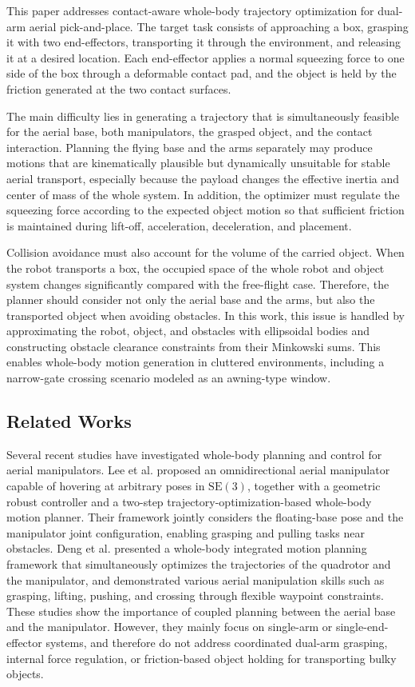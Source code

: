 \documentclass[letterpaper, 10 pt, conference]{ieeeconf}  %
\begin{document}
This paper addresses contact-aware whole-body trajectory optimization for dual-arm aerial pick-and-place. The target task consists of approaching a box, grasping it with two end-effectors, transporting it through the environment, and releasing it at a desired location. Each end-effector applies a normal squeezing force to one side of the box through a deformable contact pad, and the object is held by the friction generated at the two contact surfaces.

The main difficulty lies in generating a trajectory that is simultaneously feasible for the aerial base, both manipulators, the grasped object, and the contact interaction. Planning the flying base and the arms separately may produce motions that are kinematically plausible but dynamically unsuitable for stable aerial transport, especially because the payload changes the effective inertia and center of mass of the whole system. In addition, the optimizer must regulate the squeezing force according to the expected object motion so that sufficient friction is maintained during lift-off, acceleration, deceleration, and placement.

Collision avoidance must also account for the volume of the carried object. When the robot transports a box, the occupied space of the whole robot and object system changes significantly compared with the free-flight case. Therefore, the planner should consider not only the aerial base and the arms, but also the transported object when avoiding obstacles. In this work, this issue is handled by approximating the robot, object, and obstacles with ellipsoidal bodies and constructing obstacle clearance constraints from their Minkowski sums. This enables whole-body motion generation in cluttered environments, including a narrow-gate crossing scenario modeled as an awning-type window.

\subsection{Related Works}

Several recent studies have investigated whole-body planning and control for aerial manipulators. Lee et al. \cite{lee2025autonomous} proposed an omnidirectional aerial manipulator capable of hovering at arbitrary poses in $\mathrm{SE}(3)$, together with a geometric robust controller and a two-step trajectory-optimization-based whole-body motion planner. Their framework jointly considers the floating-base pose and the manipulator joint configuration, enabling grasping and pulling tasks near obstacles. Deng et al. \cite{deng2025whole} presented a whole-body integrated motion planning framework that simultaneously optimizes the trajectories of the quadrotor and the manipulator, and demonstrated various aerial manipulation skills such as grasping, lifting, pushing, and crossing through flexible waypoint constraints. These studies show the importance of coupled planning between the aerial base and the manipulator. However, they mainly focus on single-arm or single-end-effector systems, and therefore do not address coordinated dual-arm grasping, internal force regulation, or friction-based object holding for transporting bulky objects.
\end{document}
